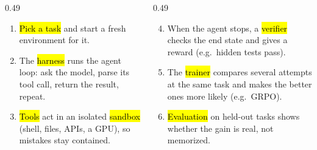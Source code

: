\begin{frame}
\vspace{5mm}
\raggedright
\begin{columns}[T,onlytextwidth]
\begin{column}{0.49\textwidth}\footnotesize
\begin{enumerate}\setlength{\itemsep}{0.6mm}
\item \hl{Pick a task} and start a fresh environment for it.
\item The \hl{harness} runs the agent loop: ask the model, parse its tool call, return the result, repeat.
\item \hl{Tools} act in an isolated \hl{sandbox} (shell, files, APIs, a GPU), so mistakes stay contained.
\end{enumerate}
\end{column}
\begin{column}{0.49\textwidth}\footnotesize
\begin{enumerate}\setcounter{enumi}{3}\setlength{\itemsep}{0.6mm}
\item When the agent stops, a \hl{verifier} checks the end state and gives a reward (e.g.\ hidden tests pass).
\item The \hl{trainer} compares several attempts at the same task and makes the better ones more likely (e.g.\ GRPO).
\item \hl{Evaluation} on held-out tasks shows whether the gain is real, not memorized.
\end{enumerate}
\end{column}
\end{columns}
\end{frame}

